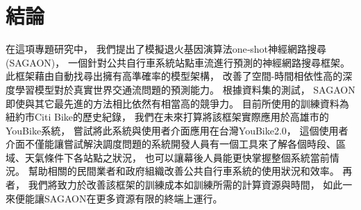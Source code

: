 \documentclass[a4paper,14pt]{extarticle}
\begin{document}
            


    \newpage
    \section{結論}
        
        在這項專題研究中，
        我們提出了模擬退火基因演算法one‑shot神經網路搜尋(SAGAON)，
        一個針對公共自行車系統站點車流進行預測的神經網路搜尋框架。
        此框架藉由自動找尋出擁有高準確率的模型架構，
        改善了空間-時間相依性高的深度學習模型對於真實世界交通流問題的預測能力。
        根據資料集的測試，
        SAGAON即使與其它最先進的方法相比依然有相當高的競爭力。
        目前所使用的訓練資料為紐約市Citi Bike的歷史紀錄，
        我們在未來打算將該框架實際應用於高雄市的YouBike系統，
        嘗試將此系統與使用者介面應用在台灣YouBike2.0，
        這個使用者介面不僅能讓嘗試解決調度問題的系統開發人員有一個工具來了解各個時段、區域、天氣條件下各站點之狀況，
        也可以讓幕後人員能更快掌握整個系統當前情況。
        幫助相關的民間業者和政府組織改善公共自行車系統的使用狀況和效率。
        再者，
        我們將致力於改善該框架的訓練成本如訓練所需的計算資源與時間，
        如此一來便能讓SAGAON在更多資源有限的終端上運行。

    \newpage
\end{document}
